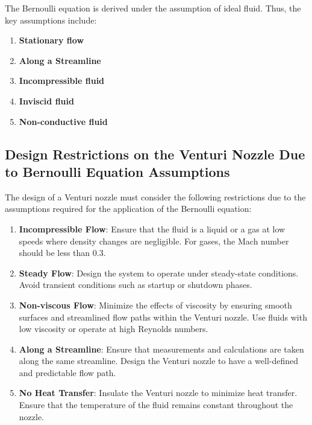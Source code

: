 \documentclass{article}
\begin{document}
The Bernoulli equation is derived under the assumption of ideal fluid. Thus, the key assumptions include:

\begin{enumerate}
    \item \textbf{Stationary flow}
    \item \textbf{Along a Streamline}
    \item \textbf{Incompressible fluid}
    \item \textbf{Inviscid fluid}
    \item \textbf{Non-conductive fluid}
    
\end{enumerate}


\subsection{Design Restrictions on the Venturi Nozzle Due to Bernoulli Equation Assumptions}

The design of a Venturi nozzle must consider the following restrictions due to the assumptions required for the application of the Bernoulli equation:

\begin{enumerate}
    \item \textbf{Incompressible Flow}: Ensure that the fluid is a liquid or a gas at low speeds where density changes are negligible. For gases, the Mach number should be less than 0.3.

    \item \textbf{Steady Flow}: Design the system to operate under steady-state conditions. Avoid transient conditions such as startup or shutdown phases.

    \item \textbf{Non-viscous Flow}: Minimize the effects of viscosity by ensuring smooth surfaces and streamlined flow paths within the Venturi nozzle. Use fluids with low viscosity or operate at high Reynolds numbers.

    \item \textbf{Along a Streamline}: Ensure that measurements and calculations are taken along the same streamline. Design the Venturi nozzle to have a well-defined and predictable flow path.

    \item \textbf{No Heat Transfer}: Insulate the Venturi nozzle to minimize heat transfer. Ensure that the temperature of the fluid remains constant throughout the nozzle.
    
\end{enumerate}
\end{document}
